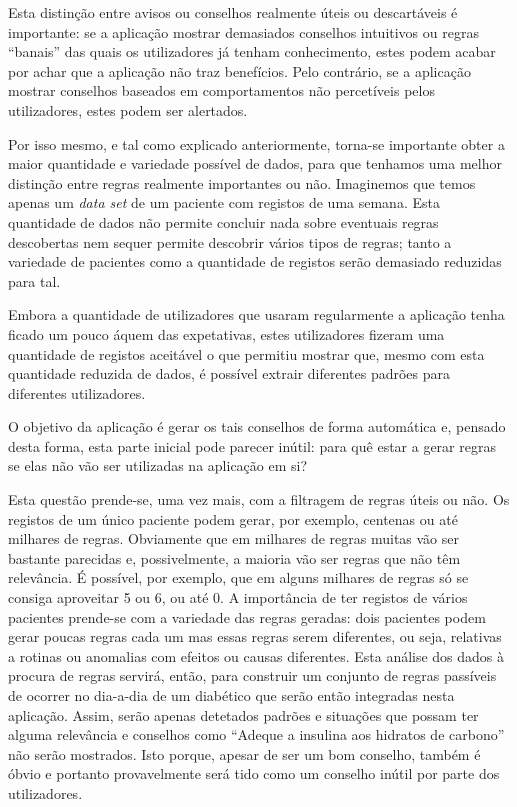 Esta distinção entre avisos ou conselhos realmente úteis ou descartáveis é importante: se a aplicação mostrar demasiados conselhos intuitivos ou regras ``banais'' das quais os utilizadores já tenham conhecimento, estes podem acabar por achar que a aplicação não traz benefícios. Pelo contrário, se a aplicação mostrar conselhos baseados em comportamentos não percetíveis pelos utilizadores, estes podem ser alertados. 

Por isso mesmo, e tal como explicado anteriormente, torna-se importante obter a maior quantidade e variedade possível de dados, para que tenhamos uma melhor distinção entre regras realmente importantes ou não. Imaginemos que temos apenas um \textit{data set} de um paciente com registos de uma semana. Esta quantidade de dados não permite concluir nada sobre eventuais regras descobertas nem sequer permite descobrir vários tipos de regras; tanto a variedade de pacientes como a quantidade de registos serão demasiado reduzidas para tal. 

Embora a quantidade de utilizadores que usaram regularmente a aplicação tenha ficado um pouco áquem das expetativas, estes utilizadores fizeram uma quantidade de registos aceitável o que permitiu mostrar que, mesmo com esta quantidade reduzida de dados, é possível extrair diferentes padrões para diferentes utilizadores.

O objetivo da aplicação é gerar os tais conselhos de forma automática e, pensado desta forma, esta parte inicial pode parecer inútil: para quê estar a gerar regras se elas não vão ser utilizadas na aplicação em si? 

Esta questão prende-se, uma vez mais, com a filtragem de regras úteis ou não. Os registos de um único paciente podem gerar, por exemplo, centenas ou até milhares de regras. Obviamente que em milhares de regras muitas vão ser bastante parecidas e, possivelmente, a maioria vão ser regras que não têm relevância. É possível, por exemplo, que em alguns milhares de regras só se consiga aproveitar 5 ou 6, ou até 0. A importância de ter registos de vários pacientes prende-se com a variedade das regras geradas: dois pacientes podem gerar poucas regras cada um mas essas regras serem diferentes, ou seja, relativas a rotinas ou anomalias com efeitos ou causas diferentes. Esta análise dos dados à procura de regras servirá, então, para construir um conjunto de regras passíveis de ocorrer no dia-a-dia de um diabético que serão então integradas nesta aplicação. Assim, serão apenas detetados padrões e situações que possam ter alguma relevância e conselhos como ``Adeque a insulina aos hidratos de carbono'' não serão mostrados. Isto porque, apesar de ser um bom conselho, também é óbvio e portanto provavelmente será tido como um conselho inútil por parte dos utilizadores. 

